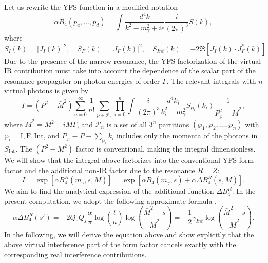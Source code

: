 Let us rewrite the YFS function in a modified notation
\begin{equation}
\alpha B_4(p_a,\ldots,p_d)=\int\frac{d^4k}{k^2-m^2_\gamma+i\epsilon}\frac{i}{(2\pi)^3}S(k),
\end{equation}
where
\begin{equation}
S_I(k)=|J_I(k)|^2,\quad S_F(k)=|J_F(k)|^2,\quad S_{Int}(k)=-2\Re[J_I(k)\cdot J^\ast_F(k)]
\end{equation}
Due to the presence of the narrow resonance, the YFS factorization of the virtual IR contribution must take into account the dependence of the scalar part of the resonance propagator on photon energies of order $\Gamma$. The relevant integrals with $n$ virtual photons is given by
\begin{equation}
I=(P^2-\bar{M}^2)\sum_{n=0}^{\infty}\frac{1}{n!}\sum_{\wp\in\mathcal{P}_n}\prod_{i=0}^{n}\int\frac{i}{(2\pi)^3}\frac{d^4k_i}{k^2_i-m_\gamma^2}S_{\wp_i}(k_i)\frac{1}{P^2_\wp-\bar{M}^2},
\end{equation}
where $\bar{M}^2=M^2-iM\Gamma$, and $\mathcal{P}_n$ is a set of all $3^n$ partitions $(\wp_1,\wp_2,\ldots,\wp_n)$ with $\wp_i=\text{I},\text{F},\text{Int}$, and $P_\wp\equiv P-\sum_{\wp_i}k_i$ includes only the momenta of the photons in $S_\text{Int}$. The $(P^2-M^2)$ factor is conventional, making the integral dimensionless. We will show that the integral above factorizes into the conventional YFS form factor and the additional non-IR factor due to the resonance $R=Z$: 
\begin{equation}
I=\exp[\alpha B^R_4(m_\gamma,s,\bar{M})]=\exp[\alpha B_4(m_\gamma,s)+\alpha\Delta B^R_4(s,\bar{M})].
\end{equation}
We aim to find the analytical expression of the additional function $\Delta B^R_4$. In the present computation, we adopt the following approximate formula \cite{Greco1,Greco2},
\begin{equation}
\alpha\Delta B^R_4(s')=-2Q_eQ_f\frac{\alpha}{\pi}\log\left(\frac{t}{u}\right)\log\left(\frac{\bar{M}^2-s}{\bar{M}^2}\right)=-\frac{1}{2}\gamma_{Int}\log\left(\frac{\bar{M}^2-s}{\bar{M}^2}\right).
\end{equation}
In the following, we will derive the equation above and show explicitly that the above virtual interference part of the form factor cancels exactly with the corresponding real interference contributions.

